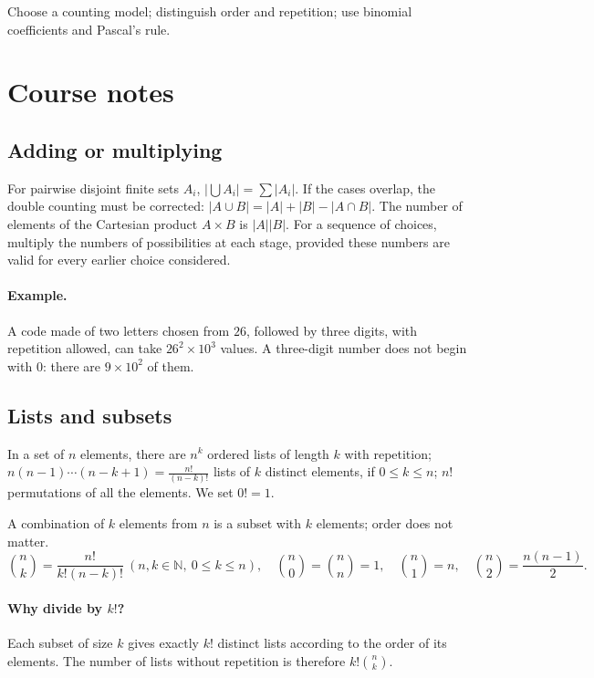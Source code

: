 \label{ch:9}


\begin{keypoint}[Objectives]Choose a counting model; distinguish order and repetition; use binomial coefficients and Pascal's rule.\end{keypoint}

\section{Course notes}
\subsection{Adding or multiplying}
For pairwise disjoint finite sets $A_i$, $|\bigcup A_i|=\sum|A_i|$. If the cases overlap, the double counting must be corrected: $|A\cup B|=|A|+|B|-|A\cap B|$.
The number of elements of the Cartesian product $A\times B$ is $|A||B|$. For a sequence of choices, multiply the numbers of possibilities at each stage, provided these numbers are valid for every earlier choice considered.
\paragraph{Example.} A code made of two letters chosen from $26$, followed by three digits, with repetition allowed, can take $26^2\times10^3$ values. A three-digit number does not begin with $0$: there are $9\times10^2$ of them.
\subsection{Lists and subsets}
In a set of $n$ elements, there are $n^k$ ordered lists of length $k$ with repetition; $n(n-1)\cdots(n-k+1)=\frac{n!}{(n-k)!}$ lists of $k$ distinct elements, if $0\le k\le n$; $n!$ permutations of all the elements. We set $0!=1$.
\begin{keypoint}[Combinations]
A combination of $k$ elements from $n$ is a subset with $k$ elements; order does not matter.
\[\binom nk=\frac{n!}{k!(n-k)!}\ (n,k\in\mathbb N,\ 0\le k\le n),\quad\binom n0=\binom nn=1,\quad\binom n1=n,\quad\binom n2=\frac{n(n-1)}2.\]
\end{keypoint}
\paragraph{Why divide by $k!$?} Each subset of size $k$ gives exactly $k!$ distinct lists according to the order of its elements. The number of lists without repetition is therefore $k!\binom nk$.
